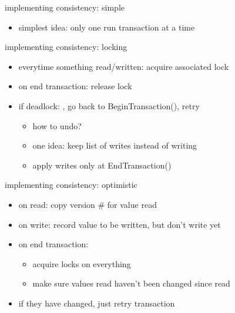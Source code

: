 \begin{frame}{implementing consistency: simple}
    \begin{itemize}
    \item simplest idea: only one run transaction at a time
    \end{itemize}
\end{frame}

\begin{frame}{implementing consistency: locking}
    \begin{itemize}
    \item everytime something read/written: acquire associated lock
    \item on end transaction: release lock
    \vspace{.5cm}
    \item if deadlock: , go back to BeginTransaction(), retry
        \begin{itemize}
        \item how to undo?
        \item one idea: keep list of writes instead of writing
        \item apply writes only at EndTransaction()
        \end{itemize}
    \end{itemize}
\end{frame}

\begin{frame}{implementing consistency: optimistic}
    \begin{itemize}
    \item on read: copy version \# for value read 
    \item on write: record value to be written, but don't write yet
    \item on end transaction: 
        \begin{itemize}
        \item acquire locks on everything
        \item make sure values read haven't been changed since read
        \end{itemize}
    \vspace{.5cm}
    \item if they have changed, just retry transaction
    \end{itemize}
\end{frame}

